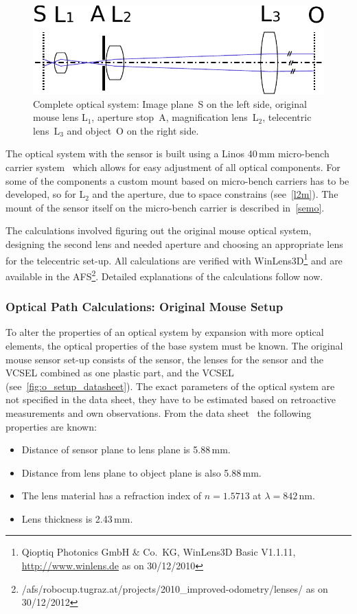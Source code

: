 \documentclass[12pt,a4paper]{article}
\begin{document}
\begin{figure}[htbp]
\begin{center}
\includegraphics[width=1\columnwidth]{figures/sketch-optic-simple}
\caption{\label{fig:sketch-optic-simple}
Complete optical system:
Image plane~S on the left side,
original mouse lens L$_1$,
aperture stop~A,
magnification lens~L$_2$,
telecentric lens~L$_3$ and object~O on the right side.
}
\end{center}
\end{figure}

The optical system with the sensor is built using a Linos 40\,mm micro-bench carrier system~\cite{microbench} which allows for easy adjustment of all optical components.
For some of the components a custom mount based on micro-bench carriers has to be developed, so for L$_2$ and the aperture, due to space constrains (see~\autoref{l2m}).
The mount of the sensor itself on the micro-bench carrier is described in~\autoref{semo}.

The calculations involved figuring out the original mouse optical system, designing the second lens and needed aperture and choosing an appropriate lens for the telecentric set-up.
All calculations are verified with WinLens3D\footnote{Qioptiq Photonics GmbH \& Co.\ KG, WinLens3D Basic V1.1.11, \url{http://www.winlens.de} as on 30/12/2010} and are available in the AFS\footnote{/afs/robocup.tugraz.at/projects/2010\_improved-odometry/lenses/ as on 30/12/2012}.
Detailed explanations of the calculations follow now.

\subsubsection{Optical Path Calculations: Original Mouse Setup}

To alter the properties of an optical system by expansion with more optical elements, the optical properties of the base system must be known.
The original mouse sensor set-up consists of the sensor, the lenses for the sensor and the VCSEL combined as one plastic part, and the VCSEL (see~\autoref{fig:o_setup_datasheet}).
The exact parameters of the optical system are not specified in the data sheet, they have to be estimated based on retroactive measurements and own observations.
From the data sheet~\cite{adns} the following properties are known: 
\begin{itemize}
  \item Distance of sensor plane to lens plane is 5.88\,mm.
  \item Distance from lens plane to object plane is also 5.88\,mm.
  \item The lens material has a refraction index of $n=1.5713$ at $\lambda=842$\,nm.
  \item Lens thickness is 2.43\,mm.
\end{itemize}
\end{document}
